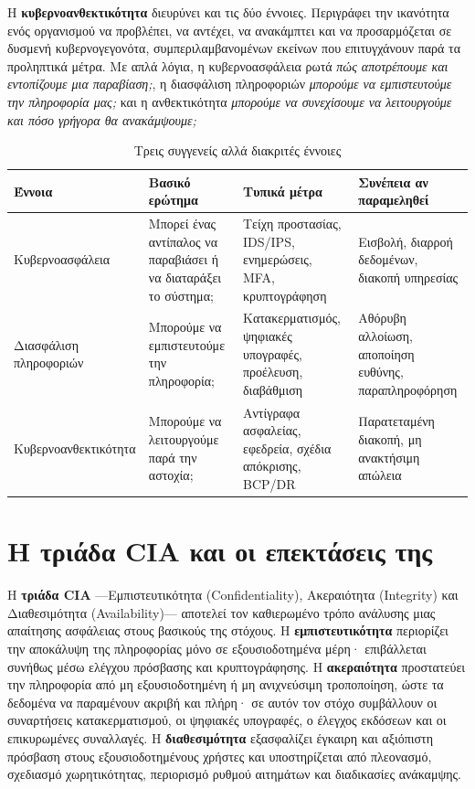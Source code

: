 \documentclass[11pt,openany]{book}
\begin{document}
Η \textbf{κυβερνοανθεκτικότητα} διευρύνει και τις δύο έννοιες. Περιγράφει την ικανότητα ενός οργανισμού να προβλέπει, να αντέχει, να ανακάμπτει και να προσαρμόζεται σε δυσμενή κυβερνογεγονότα, συμπεριλαμβανομένων εκείνων που επιτυγχάνουν παρά τα προληπτικά μέτρα. Με απλά λόγια, η κυβερνοασφάλεια ρωτά \emph{πώς αποτρέπουμε και εντοπίζουμε μια παραβίαση;}, η διασφάλιση πληροφοριών \emph{μπορούμε να εμπιστευτούμε την πληροφορία μας;} και η ανθεκτικότητα \emph{μπορούμε να συνεχίσουμε να λειτουργούμε και πόσο γρήγορα θα ανακάμψουμε;}

\begin{table}[htbp]
  \centering\small
  \caption{Τρεις συγγενείς αλλά διακριτές έννοιες}
  \begin{tabularx}{\linewidth}{>{\raggedright\arraybackslash}X >{\raggedright\arraybackslash}X >{\raggedright\arraybackslash}X >{\raggedright\arraybackslash}X}
    \toprule
    \textbf{Έννοια} & \textbf{Βασικό ερώτημα} & \textbf{Τυπικά μέτρα} & \textbf{Συνέπεια αν παραμεληθεί} \\
    \midrule
    Κυβερνοασφάλεια & Μπορεί ένας αντίπαλος να παραβιάσει ή να διαταράξει το σύστημα; & Τείχη προστασίας, IDS/IPS, ενημερώσεις, MFA, κρυπτογράφηση & Εισβολή, διαρροή δεδομένων, διακοπή υπηρεσίας \\
    Διασφάλιση πληροφοριών & Μπορούμε να εμπιστευτούμε την πληροφορία; & Κατακερματισμός, ψηφιακές υπογραφές, προέλευση, διαβάθμιση & Αθόρυβη αλλοίωση, αποποίηση ευθύνης, παραπληροφόρηση \\
    Κυβερνοανθεκτικότητα & Μπορούμε να λειτουργούμε παρά την αστοχία; & Αντίγραφα ασφαλείας, εφεδρεία, σχέδια απόκρισης, BCP/DR & Παρατεταμένη διακοπή, μη ανακτήσιμη απώλεια \\
    \bottomrule
  \end{tabularx}
\end{table}
\section{Η τριάδα CIA και οι επεκτάσεις της}\label{sec:1.2}
Η \textbf{τριάδα CIA} —Εμπιστευτικότητα (Confidentiality), Ακεραιότητα (Integrity) και Διαθεσιμότητα (Availability)— αποτελεί τον καθιερωμένο τρόπο ανάλυσης μιας απαίτησης ασφάλειας στους βασικούς της στόχους. Η \textbf{εμπιστευτικότητα} περιορίζει την αποκάλυψη της πληροφορίας μόνο σε εξουσιοδοτημένα μέρη· επιβάλλεται συνήθως μέσω ελέγχου πρόσβασης και κρυπτογράφησης. Η \textbf{ακεραιότητα} προστατεύει την πληροφορία από μη εξουσιοδοτημένη ή μη ανιχνεύσιμη τροποποίηση, ώστε τα δεδομένα να παραμένουν ακριβή και πλήρη· σε αυτόν τον στόχο συμβάλλουν οι συναρτήσεις κατακερματισμού, οι ψηφιακές υπογραφές, ο έλεγχος εκδόσεων και οι επικυρωμένες συναλλαγές. Η \textbf{διαθεσιμότητα} εξασφαλίζει έγκαιρη και αξιόπιστη πρόσβαση στους εξουσιοδοτημένους χρήστες και υποστηρίζεται από πλεονασμό, σχεδιασμό χωρητικότητας, περιορισμό ρυθμού αιτημάτων και διαδικασίες ανάκαμψης.
\end{document}
